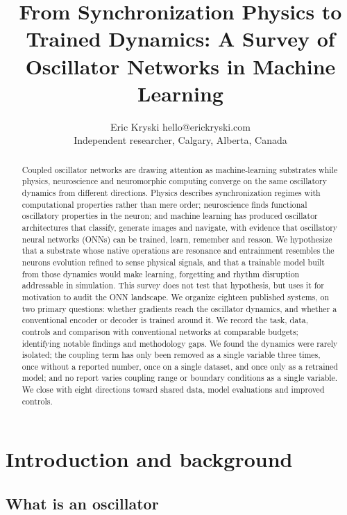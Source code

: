 \documentclass[10pt]{article}
\title{From Synchronization Physics to Trained Dynamics: A Survey of
Oscillator Networks in Machine Learning}
\author{\name Eric Kryski \email hello@erickryski.com \\
      \addr Independent researcher, Calgary, Alberta, Canada}
\date{}
\makeatletter
\newcommand{\tmlr@floatbarrier}{\par\vspace{\z@}%
  \ifx\@deferlist\@empty\else\clearpage\fi}
\let\tmlr@section\section
\renewcommand{\section}{\tmlr@floatbarrier\tmlr@section}
\makeatother
\begin{document}
\maketitle
\begin{abstract}
Coupled oscillator networks are drawing attention as machine-learning
substrates while physics, neuroscience and neuromorphic computing
converge on the same oscillatory dynamics from different directions.
Physics describes synchronization regimes with computational properties
rather than mere order; neuroscience finds functional oscillatory
properties in the neuron; and machine learning has produced oscillator
architectures that classify, generate images and navigate, with evidence
that oscillatory neural networks (ONNs) can be trained, learn, remember
and reason. We hypothesize that a substrate whose native operations are
resonance and entrainment resembles the neurons evolution refined to
sense physical signals, and that a trainable model built from those
dynamics would make learning, forgetting and rhythm disruption
addressable in simulation. This survey does not test that hypothesis,
but uses it for motivation to audit the ONN landscape. We organize
eighteen published systems, on two primary questions: whether gradients
reach the oscillator dynamics, and whether a conventional encoder or
decoder is trained around it. We record the task, data, controls and
comparison with conventional networks at comparable budgets; identifying
notable findings and methodology gaps. We found the dynamics were rarely
isolated; the coupling term has only been removed as a single variable
three times, once without a reported number, once on a single dataset,
and once only as a retrained model; and no report varies coupling range
or boundary conditions as a single variable. We close with eight
directions toward shared data, model evaluations and improved controls.
\end{abstract}

\section{Introduction and background}\label{sec-1}

\subsection{What is an oscillator}\label{sec-1-1}
\end{document}
